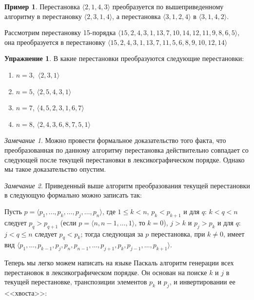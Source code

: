 \documentclass[12pt,a4paper]{article}
\theoremstyle{plain}
\theoremstyle{definition}
\newtheorem*{task}{Упражнение}
\newtheorem*{example}{Пример}
\theoremstyle{remark}
\newtheorem*{remark}{Замечание}
\begin{document}
\begin{example}
Перестановка $\langle 2,1,4,3 \rangle$ преобразуется по вышеприведенному алгоритму в перестановку $\langle 2,3,1,4 \rangle$, а перестановка $\langle 3,1,2,4 \rangle$ в $\langle 3,1,4,2 \rangle$.

Рассмотрим перестановку 15-порядка $\langle 15,2,4,3,1,13,7,10,14,12,11,9,8,6,5 \rangle$, она преобразуется в перестановку $\langle 15,2,4,3,1,13,7,11,5,6,8,9,10,12,14 \rangle$
\end{example}

\begin{task}
В какие перестановки преобразуются следующие перестановки: 
\begin{enumerate}
\item $n=3,$ $\langle 2,3,1 \rangle$
\item $n=5$, $\langle 2,5,4,3,1 \rangle$
\item $n=7$, $\langle 4,5,2,3,1,6,7 \rangle$
\item $n=8$, $\langle 2,4,3,6,8,7,5,1 \rangle$
\end{enumerate}
\end{task}

\begin{remark}
Можно провести формальное доказательство того факта, что преобразованная по данному алгоритму перестановка действительно совпадает со следующей после текущей перестановки в лексикографическом порядке. Однако мы такое доказательство опустим.
\end{remark}

\begin{remark}
Приведенный выше алгоритм преобразования текущей перестановки в следующую формально можно записать так:

Пусть $p=\langle p_1,\ldots,p_k,\ldots,p_j,\ldots,p_n\rangle$, где $1\le k<n$, $p_k<p_{k+1}$ и для $q$: $k<q<n$ следует $p_q>p_{q+1}$ (если $p=\langle n,n-1,\ldots,1\rangle$, то $k=0$), $j>k$ и $p_j>p_k$ и для $q$: $j<q\le n$ следует $p_q<p_k$; тогда следующая за $p$ перестановка, при $k\ne0$, имеет вид $\langle p_1,\ldots,p_{k-1},p_j,p_n,p_{n-1},\ldots,p_{j+1},p_k,p_{j-1},\ldots,p_{k+1}\rangle$.
\end{remark}

Теперь мы легко можем написать на языке Паскаль алгоритм генерации всех перестановок в лексикографическом порядке. Он основан на поиске $k$ и $j$ в текущей перестановке, транспозиции элементов $p_k$ и $p_j$, и инвертировании ее <<хвоста>>:
\end{document}
